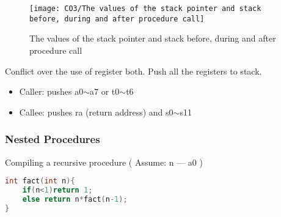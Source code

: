 \begin{figure}[!htb]
    \centering
    \texttt{[image: CO3/The values of the stack pointer and stack before, during and after procedure call]}
    \caption{The values of the stack pointer and stack before, during and after procedure call}
\end{figure}

Conflict over the use of register both. Push all the registers to stack. 
\begin{itemize}
    \item\small Caller: pushes a0$\sim$a7 or t0$\sim$t6
    \item\small Callee: pushes ra (return address) and s0$\sim$s11
\end{itemize}


\subsubsection{Nested Procedures}
Compiling a recursive procedure ( Assume: n --- a0 )
\begin{lstlisting}[language={c},title={C code for n!}]
int fact(int n){
    if(n<1)return 1;
    else return n*fact(n-1);
}
\end{lstlisting}

